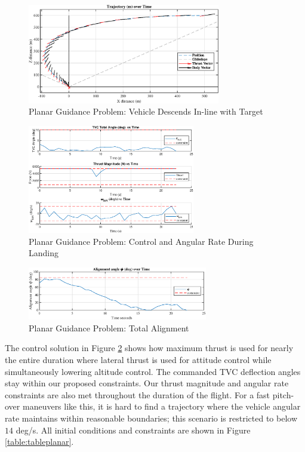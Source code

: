 \documentclass[conf]{new-aiaa}
\begin{document}
\begin{figure}[!htbp] 
  \centering
  \includegraphics[width=0.75\textwidth]{figs/planar_traj.eps}
  \caption{Planar Guidance Problem: Vehicle Descends In-line with Target}
  \label{fig:planar}
 \end{figure}
\begin{figure}[!htbp] 
\label{planar_controls}
  \centering
  \includegraphics[width=0.65\textwidth]{figs/planar_controls.eps}
  \caption{Planar Guidance Problem: Control and Angular Rate During Landing}
  \label{fig:planarcontrols}
 \end{figure}

\begin{figure}[!htbp] 
  \centering
  \includegraphics[width=0.7\textwidth]{figs/planar_alignment.eps}
  \caption{Planar Guidance Problem: Total Alignment}
  \label{fig:nplanar_align}
 \end{figure}


The control solution in Figure \ref{fig:planarcontrols} shows how maximum thrust is used for nearly the entire duration where lateral thrust is used for attitude control while simultaneously lowering altitude control. The commanded TVC deflection angles stay within our proposed constraints. Our thrust magnitude and angular rate constraints are also met throughout the duration of the flight. For a fast pitch-over maneuvers like this, it is hard to find a trajectory where the vehicle angular rate maintains within reasonable boundaries; this scenario is restricted to below $14$ deg/s. All initial conditions and constraints are shown in Figure \ref{table:tableplanar}.
\end{document}
